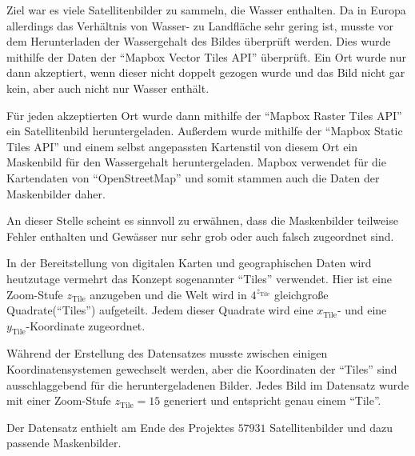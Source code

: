 Ziel war es viele Satellitenbilder zu sammeln, die Wasser enthalten.
Da in Europa allerdings das Verhältnis von Wasser- zu Landfläche sehr gering ist, musste vor dem Herunterladen der Wassergehalt des Bildes überprüft werden.
Dies wurde mithilfe der Daten der \enquote{Mapbox Vector Tiles API} überprüft. \cite{mapbox_vector_tiles}
Ein Ort wurde nur dann akzeptiert, wenn dieser nicht doppelt gezogen wurde und das Bild nicht gar kein, aber auch nicht nur Wasser enthält.

Für jeden akzeptierten Ort wurde dann mithilfe der \enquote{Mapbox Raster Tiles API} ein Satellitenbild heruntergeladen.\cite{mapbox_raster_tiles}
Außerdem wurde mithilfe der \enquote{Mapbox Static Tiles API} und einem selbst angepassten Kartenstil von diesem Ort ein Maskenbild für den Wassergehalt heruntergeladen.\cite{mapbox_static_tiles}
Mapbox verwendet für die Kartendaten von \enquote{OpenStreetMap} und somit stammen auch die Daten der Maskenbilder daher.\cite{OpenStreetMap}

An dieser Stelle scheint es sinnvoll zu erwähnen, dass die Maskenbilder teilweise Fehler enthalten und Gewässer nur sehr grob oder auch falsch zugeordnet sind. 

In der Bereitstellung von digitalen Karten und geographischen Daten wird heutzutage vermehrt das Konzept sogenannter \enquote{Tiles} verwendet.\cite{tiles}
Hier ist eine Zoom-Stufe $z_\text{Tile}$ anzugeben und die Welt wird in $4^{z_\text{Tile}}$ gleichgroße Quadrate(\enquote{Tiles}) aufgeteilt.
Jedem dieser Quadrate wird eine $x_\text{Tile}$- und eine $y_\text{Tile}$-Koordinate zugeordnet.

Während der Erstellung des Datensatzes musste zwischen einigen Koordinatensystemen gewechselt werden, aber die Koordinaten der \enquote{Tiles} sind ausschlaggebend für die heruntergeladenen Bilder.
Jedes Bild im Datensatz wurde mit einer Zoom-Stufe $z_\text{Tile} = 15$ generiert und entspricht genau einem \enquote{Tile}.

Der Datensatz enthielt am Ende des Projektes $57931$ Satellitenbilder und dazu passende Maskenbilder.
